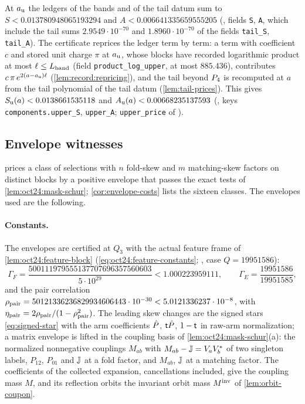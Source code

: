 At $a_{\rm u}$ the ledgers of the bands and of the tail datum sum to
$S<0.013780948065193294$ and $A<0.006641335659555205$ (, fields
\texttt{S}, \texttt{A}, which include the tail sums $2.9549\cdot10^{-70}$ and
$1.8960\cdot10^{-70}$ of the fields \texttt{tail\_S}, \texttt{tail\_A}). The certificate
reprices the ledger term by term: a term with coefficient $c$ and stored unit
charge $\pi$ at $a_{\rm u}$, whose blocks have recorded logarithmic product at most
$\ell\le L_{\rm band}$ (field \texttt{product\_log\_upper}, at most $885.436$),
contributes $c\,\pi\,e^{2(a-a_{\rm u})\ell}$ (\cref{lem:record:repricing}), and the
tail beyond $P_4$ is recomputed at $a$ from the tail polynomial of the tail
datum (\cref{lem:tail-prices}). This gives $S_{\rm u}(a)<0.0138661535118$ and
$A_{\rm u}(a)<0.00668235137593$ (, keys \texttt{components.upper\_S},
\texttt{upper\_A}; \texttt{upper\_price} of
).

\subsection{Envelope witnesses}\label{subsec:data:envelopes}

 prices a class of selections with $n$ fold-skew and $m$
matching-skew factors on distinct blocks by a positive envelope that passes the
exact tests of \cref{lem:oct24:mask-schur}; \cref{cor:envelope-costs} lists the
sixteen classes. The envelopes used are the following.

\paragraph{Constants.}
The envelopes are certified at $Q_3$ with the actual feature frame of
\cref{lem:oct24:feature-block} (\eqref{eq:oct24:feature-constants};
, case
$Q=19951586$):
\[
 \Gamma_F=\frac{500111979555137707696357560603}{5\cdot10^{29}}<1.000223959111,\qquad
 \Gamma_E=\frac{19951586}{19951585},
\]
and the pair correlation
$\rho_{\rm pair}=50121336236829934606443\cdot10^{-30}<5.0121336237\cdot10^{-8}$,
with $\eta_{\rm pair}=2\rho_{\rm pair}/(1-\rho_{\rm pair}^2)$. The leading skew changes are the signed stars
\eqref{eq:signed-star} with the arm coefficients $\hat P$, $\mathsf t\hat P$, $1-\mathsf t$ in
raw-arm normalization; a matrix envelope is lifted in the coupling basis of
\cref{lem:oct24:mask-schur}(a): the normalized nonnegative couplings $M_{ab}$
with $M_{ab}-\mathbb J=V_aV_b^*$ of two singleton labels, $P_{12}$,
$P_{01}$ and $\mathbb J$ at a fold factor, and $M_{ab}$, $\mathbb J$ at a matching
factor. The coefficients of the collected expansion, cancellations included,
give the coupling mass $M$, and its reflection orbits the invariant orbit mass
$M^{\rm inv}$ of \cref{lem:orbit-coupon}.

